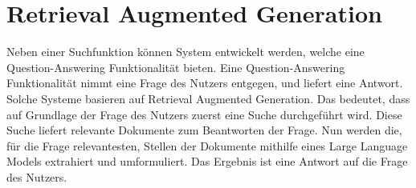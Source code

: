 \section{Retrieval Augmented Generation}
Neben einer Suchfunktion können System entwickelt werden, welche eine Question-Answering Funktionalität bieten.
Eine Question-Answering Funktionalität nimmt eine Frage des Nutzers entgegen, und liefert eine Antwort.
Solche Systeme basieren auf Retrieval Augmented Generation.
Das bedeutet, dass auf Grundlage der Frage des Nutzers zuerst eine Suche durchgeführt wird.
Diese Suche liefert relevante Dokumente zum Beantworten der Frage.
Nun werden die, für die Frage relevantesten, Stellen der Dokumente mithilfe eines Large Language Models extrahiert und umformuliert.
Das Ergebnis ist eine Antwort auf die Frage des Nutzers. 
